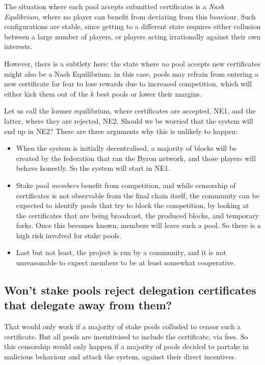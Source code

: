 \documentclass[11pt,a4paper]{article}
\begin{document}
The situation where each pool accepts submitted certificates is a \emph{Nash
  Equlibrium}, where no player can benefit from deviating from this beaviour.
Such configurations are stable, since getting to a different state requires
either collusion between a large number of players, or players acting
irrationally against their own interests.

However, there is a subtlety here: the state where \emph{no} pool accepts new
certificates might also be a Nash Equilibrium: in this case, pools may refrain
from entering a new certificate for fear to lose rewards due to increased
competition, which will either kick them out of the \(k\) best pools or lower
their margins.

Let us call the former equilibrium, where certificates are accepted, NE1, and
the latter, where they are rejected, NE2. Should we be worried that the system
will end up in NE2? There are three arguments why this is unlikely to happen:

\begin{itemize}
\item When the system is initially decentralised, a majority of blocks will be
  created by the federation that ran the Byron network, and those players will
  behave honestly. So the system will start in NE1.
\item Stake pool \emph{members} benefit from competition, and while censorship
  of certificates is not observable from the final chain itself, the community
  can be expected to identify pools that try to block the competition, by
  looking at the certificates that are being broadcast, the produced blocks, and
  temporary forks. Once this becomes known, members will leave such a pool. So
  there is a high risk involved for stake pools.
\item Last but not least, the project is run by a community, and it is not
  unreasonable to expect members to be at least somewhat cooperative.
\end{itemize}

\subsection{Won't stake pools reject delegation certificates that delegate away
  from them?}

That would only work if a majority of stake pools colluded to censor such a
certificate. But all pools are incentivised to include the certificate, via
fees. So this censorship would only happen if a majority of pools decided to
partake in malicious behaviour and attack the system, against their direct
incentives.



\end{document}
